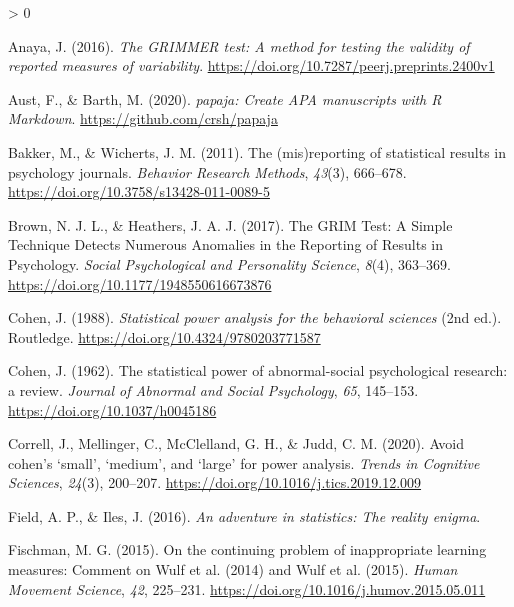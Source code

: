\documentclass[
  english,
  man,floatsintext]{apa7}
\newlength{\cslhangindent}
\newenvironment{CSLReferences}[2] %
 {%
  \setlength{\parindent}{0pt}
  \ifodd #1 \everypar{\setlength{\hangindent}{\cslhangindent}}\ignorespaces\fi
  \ifnum #2 > 0
  \setlength{\parskip}{#2\baselineskip}
  \fi
 }%
 {}
\begin{document}
\begingroup
\setlength{\parindent}{-0.5in}
\setlength{\leftskip}{0.5in}

\endgroup

\hypertarget{refs}{}
\begin{CSLReferences}{1}{0}
\leavevmode\hypertarget{ref-anaya2016}{}%
Anaya, J. (2016). \emph{The GRIMMER test: A method for testing the validity of reported measures of variability}. \url{https://doi.org/10.7287/peerj.preprints.2400v1}

\leavevmode\hypertarget{ref-R-papaja}{}%
Aust, F., \& Barth, M. (2020). \emph{{papaja}: {Create} {APA} manuscripts with {R Markdown}}. \url{https://github.com/crsh/papaja}

\leavevmode\hypertarget{ref-bakker2011}{}%
Bakker, M., \& Wicherts, J. M. (2011). The (mis)reporting of statistical results in psychology journals. \emph{Behavior Research Methods}, \emph{43}(3), 666--678. \url{https://doi.org/10.3758/s13428-011-0089-5}

\leavevmode\hypertarget{ref-brown2017}{}%
Brown, N. J. L., \& Heathers, J. A. J. (2017). The GRIM Test: A Simple Technique Detects Numerous Anomalies in the Reporting of Results in Psychology. \emph{Social Psychological and Personality Science}, \emph{8}(4), 363--369. \url{https://doi.org/10.1177/1948550616673876}

\leavevmode\hypertarget{ref-cohen1988}{}%
Cohen, J. (1988). \emph{Statistical power analysis for the behavioral sciences} (2nd ed.). Routledge. \url{https://doi.org/10.4324/9780203771587}

\leavevmode\hypertarget{ref-cohen1962}{}%
Cohen, J. (1962). The statistical power of abnormal-social psychological research: a review. \emph{Journal of Abnormal and Social Psychology}, \emph{65}, 145--153. \url{https://doi.org/10.1037/h0045186}

\leavevmode\hypertarget{ref-correll2020}{}%
Correll, J., Mellinger, C., McClelland, G. H., \& Judd, C. M. (2020). Avoid cohen{'}s {`}small{'}, {`}medium{'}, and {`}large{'} for power analysis. \emph{Trends in Cognitive Sciences}, \emph{24}(3), 200--207. \url{https://doi.org/10.1016/j.tics.2019.12.009}

\leavevmode\hypertarget{ref-field2016}{}%
Field, A. P., \& Iles, J. (2016). \emph{An adventure in statistics: The reality enigma}.

\leavevmode\hypertarget{ref-fischman2015}{}%
Fischman, M. G. (2015). On the continuing problem of inappropriate learning measures: Comment on Wulf et al. (2014) and Wulf et al. (2015). \emph{Human Movement Science}, \emph{42}, 225--231. \url{https://doi.org/10.1016/j.humov.2015.05.011}


\end{CSLReferences}
\end{document}
